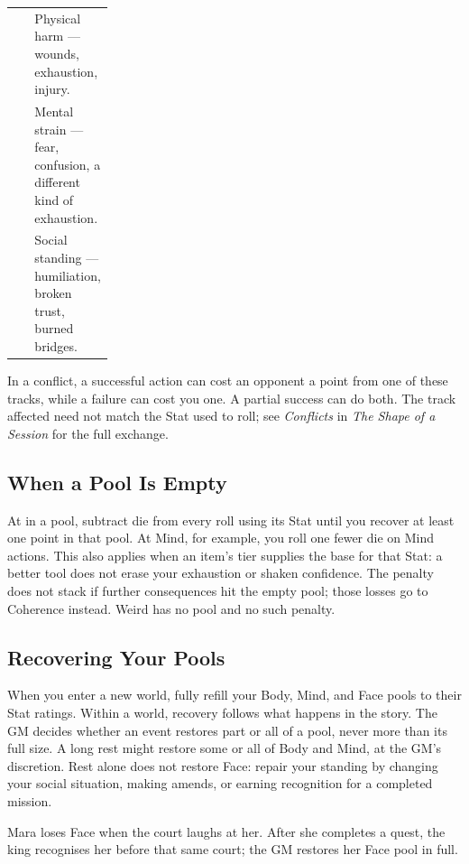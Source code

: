 \begin{statblock}
\begin{tabularx}{\linewidth}{@{}p{0.22\linewidth} Y@{}}
 & Physical harm --- wounds, exhaustion, injury.\\[3pt]
 & Mental strain --- fear, confusion, a different kind of exhaustion.\\[3pt]
 & Social standing --- humiliation, broken trust, burned bridges.\\
\end{tabularx}
\end{statblock}

In a conflict, a successful action can cost an opponent a point from
one of these tracks, while a failure can cost you one. A partial success
can do both. The track affected need not match the Stat used to roll;
see \emph{Conflicts} in \emph{The Shape of a Session} for the full
exchange.

\subsection*{When a Pool Is Empty}
At  in a pool, subtract  die from every roll using its
Stat until you recover at least one point in that pool. At 
Mind, for example, you roll one fewer die on Mind actions. This also
applies when an item's tier supplies the base for that Stat: a better
tool does not erase your exhaustion or shaken confidence. The penalty
does not stack if further consequences hit the empty pool; those losses
go to Coherence instead. Weird has no pool and no such penalty.

\subsection*{Recovering Your Pools}
When you enter a new world, fully refill your Body, Mind, and Face pools
to their Stat ratings. Within a world, recovery follows what happens in
the story. The GM decides whether an event restores part or all of a
pool, never more than its full size. A long rest might restore some or
all of Body and Mind, at the GM's discretion. Rest alone does not
restore Face: repair your standing by changing your social situation,
making amends, or earning recognition for a completed mission.

\begin{example}
Mara loses Face when the court laughs at her. After she completes a
quest, the king recognises her before that same court; the GM restores
her Face pool in full.
\end{example}

